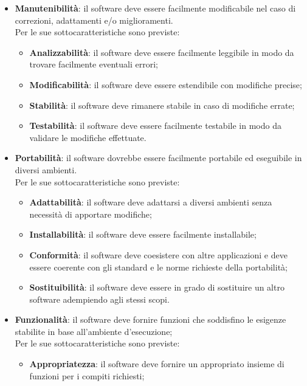 \documentclass[../norme-di-progetto.tex]{subfiles}
\begin{document}
\begin{itemize}
    \item \textbf{Manutenibilità}: il software deve essere facilmente modificabile nel caso di correzioni, adattamenti e/o miglioramenti.
        \\Per le sue sottocaratteristiche sono previste:
        \begin{itemize}
            \item \textbf{Analizzabilità}: il software deve essere facilmente leggibile in modo da trovare facilmente eventuali errori;
            \item \textbf{Modificabilità}: il software deve essere estendibile con modifiche precise;
            \item \textbf{Stabilità}: il software deve rimanere stabile in caso di modifiche errate;
            \item \textbf{Testabilità}: il software deve essere facilmente testabile in modo da validare le modifiche effettuate.
        \end{itemize}
        \item \textbf{Portabilità}: il software dovrebbe essere facilmente portabile ed eseguibile in diversi ambienti.
        \\Per le sue sottocaratteristiche sono previste:
        \begin{itemize}
            \item \textbf{Adattabilità}: il software deve adattarsi a diversi ambienti senza necessità di apportare modifiche;
            \item \textbf{Installabilità}: il software deve essere facilmente installabile;
            \item \textbf{Conformità}: il software deve coesistere con altre applicazioni e deve essere coerente con gli standard e le norme richieste della portabilità;
            \item \textbf{Sostituibilità}: il software deve essere in grado di sostituire un altro software adempiendo agli stessi scopi.
        \end{itemize}
        \item \textbf{Funzionalità}: il software deve fornire funzioni che soddisfino le esigenze stabilite in base all'ambiente d'esecuzione;
        \\Per le sue sottocaratteristiche sono previste:
        \begin{itemize}
            \item \textbf{Appropriatezza}: il software deve fornire un appropriato insieme di funzioni per i compiti richiesti;

\end{itemize}
\end{itemize}
\end{document}
